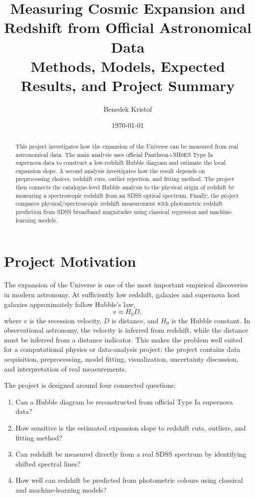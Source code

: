 \documentclass[11pt,a4paper]{article}
\title{Measuring Cosmic Expansion and Redshift from Official Astronomical Data\\
\large Methods, Models, Expected Results, and Project Summary}
\author{Benedek Kristof}
\date{\today}
\begin{document}
\maketitle

\begin{abstract}
This project investigates how the expansion of the Universe can be measured from real astronomical data. The main analysis uses official Pantheon+SH0ES Type Ia supernova data to construct a low-redshift Hubble diagram and estimate the local expansion slope. A second analysis investigates how the result depends on preprocessing choices, redshift cuts, outlier rejection, and fitting method. The project then connects the catalogue-level Hubble analysis to the physical origin of redshift by measuring a spectroscopic redshift from an SDSS optical spectrum. Finally, the project compares physical/spectroscopic redshift measurement with photometric redshift prediction from SDSS broadband magnitudes using classical regression and machine-learning models.
\end{abstract}

\section{Project Motivation}

The expansion of the Universe is one of the most important empirical discoveries in modern astronomy. At sufficiently low redshift, galaxies and supernova host galaxies approximately follow Hubble's law,
\begin{equation}
    v \approx H_0 D,
\end{equation}
where $v$ is the recession velocity, $D$ is distance, and $H_0$ is the Hubble constant. In observational astronomy, the velocity is inferred from redshift, while the distance must be inferred from a distance indicator. This makes the problem well suited for a computational physics or data-analysis project: the project contains data acquisition, preprocessing, model fitting, visualization, uncertainty discussion, and interpretation of real measurements.

The project is designed around four connected questions:
\begin{enumerate}[label=\textbf{Q\arabic*.}]
    \item Can a Hubble diagram be reconstructed from official Type Ia supernova data?
    \item How sensitive is the estimated expansion slope to redshift cuts, outliers, and fitting method?
    \item Can redshift be measured directly from a real SDSS spectrum by identifying shifted spectral lines?
    \item How well can redshift be predicted from photometric colours using classical and machine-learning models?
\end{enumerate}
\end{document}
